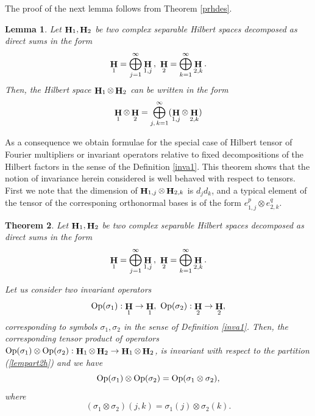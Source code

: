 \documentclass[a4paper,12pt,reqno]{amsart}
\renewcommand\eqref[1]{(\ref{#1})} %
\newtheorem{thm}{Theorem}[section]
\newtheorem{lem}[thm]{Lemma}
\theoremstyle{definition}
\theoremstyle{remark}
\numberwithin{equation}{section}
\def\Op{{{\rm Op}}}
\def\Op{\text{\rm Op}}
\DeclareMathOperator{\Hi}{{\bf H}}
\begin{document}
The proof of the next lemma follows from Theorem \ref{prhdes}. 
\begin{lem}\label{lesh2x} Let $\Hi_1, \Hi_2$  be two complex separable Hilbert spaces decomposed as direct sums in the form
\[\Hi_1=\bigoplus\limits_{j=1}^{\infty}\Hi_{1,j}\, ,\,\, \Hi_2=\bigoplus\limits_{k=1}^{\infty}\Hi_{2,k}. \]
Then, the Hilbert space $\Hi_1\otimes\Hi_2$ can be written in the form 
\begin{equation}\label{lempart2h}
    \Hi_1\otimes\Hi_2=\bigoplus\limits_{j,\,k=1}^{\infty}(\Hi_{1,j}\otimes\Hi_{2,k})
    \end{equation}
\end{lem}
As a consequence we obtain formulae for the special case of Hilbert tensor of Fourier multipliers or invariant operators relative to fixed decompositions of the Hilbert factors in the sense of the Definition \ref{inva1}. This theorem shows that the notion of invariance herein considered is well behaved with respect to tensors. First we note that the dimension  of $\Hi_{1,j}\otimes\Hi_{2,k}$ is $d_jd_k$, and a typical element of the tensor of the corresponing orthonormal bases is of the form $e_{1,j}^p\otimes e_{2,k}^q$.
\begin{thm}\label{lesh2x2} Let $\Hi_1, \Hi_2$  be two complex separable Hilbert spaces decomposed as direct sums in the form
\[\Hi_1=\bigoplus\limits_{j=1}^{\infty}\Hi_{1,j}\, ,\,\, \Hi_2=\bigoplus\limits_{k=1}^{\infty}\Hi_{2,k}. \]

Let us consider two invariant operators 
\[\Op(\sigma_1):\Hi_1\rightarrow\Hi_1,\,\, \Op(\sigma_2):\Hi_2\rightarrow\Hi_2,\]
corresponding to symbols $\sigma_1, \sigma_2$ in the sense of Definition \ref{inva1}. Then, the corresponding tensor product of operators $\Op(\sigma_1)\otimes\Op(\sigma_2):\Hi_1\otimes\Hi_2\rightarrow \Hi_1\otimes\Hi_2$, is invariant with respect to the partition \eqref{lempart2h} and  we have
\[ \Op(\sigma_1)\otimes\Op(\sigma_2)=\Op(\sigma_1\otimes\sigma_2),\]
where 
\[(\sigma_1\otimes\sigma_2)(j,k)=\sigma_1(j)\otimes\sigma_2(k).\]
\end{thm}
\end{document}
